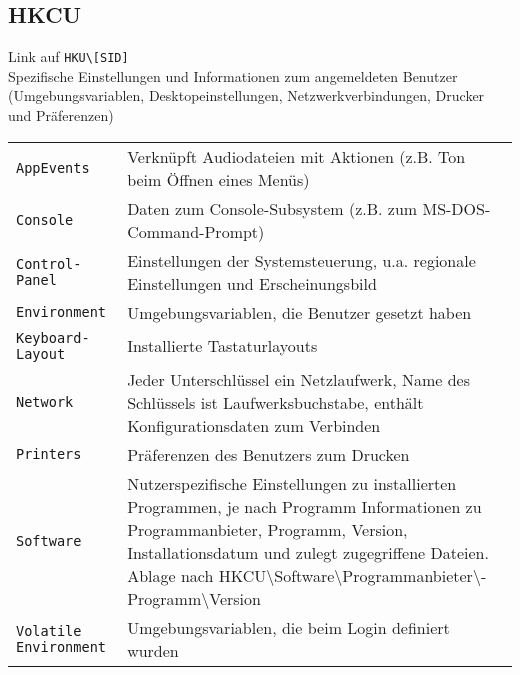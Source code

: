 \subsection{HKCU}
Link auf \texttt{HKU\textbackslash [SID]}\\
Spezifische Einstellungen und Informationen zum angemeldeten Benutzer (Umgebungsvariablen, Desktopeinstellungen, Netzwerkverbindungen, Drucker und Präferenzen)
\settowidth{\MyLen}{SID.classes.length.long.}
\begin{tabular}{@{}p{\the\MyLen}%
		@{}p{\linewidth-\the\MyLen}@{}}
	\texttt{AppEvents} & Verknüpft Audiodateien mit Aktionen (z.B. Ton beim Öffnen eines Menüs)\\
	\texttt{Console} & Daten zum Console-Subsystem (z.B. zum MS-DOS-Command-Prompt)\\
	\texttt{Control-Panel} & Einstellungen der Systemsteuerung, u.a. regionale Einstellungen und Erscheinungsbild\\
	\texttt{Environment} & Umgebungsvariablen, die Benutzer gesetzt haben\\
	\texttt{Keyboard-Layout} & Installierte Tastaturlayouts\\
	\texttt{Network} & Jeder Unterschlüssel ein Netzlaufwerk, Name des Schlüssels ist Laufwerksbuchstabe, enthält Konfigurationsdaten zum Verbinden\\
	\texttt{Printers} & Präferenzen des Benutzers zum Drucken\\
	\texttt{Software} & Nutzerspezifische Einstellungen zu installierten Programmen, je nach Programm Informationen zu Programmanbieter, Programm, Version, Installationsdatum und zulegt zugegriffene Dateien. Ablage nach HKCU\textbackslash Software\textbackslash Programmanbieter\textbackslash -Programm\textbackslash Version\\
	\texttt{Volatile Environment} & Umgebungsvariablen, die beim Login definiert wurden\\
\end{tabular}

